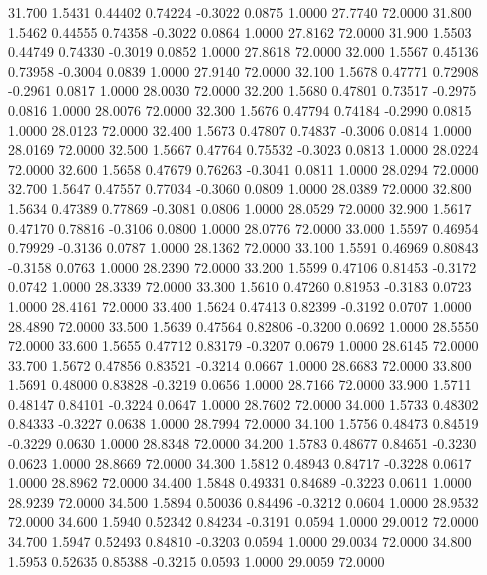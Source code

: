   31.700   1.5431   0.44402   0.74224  -0.3022   0.0875   1.0000  27.7740  72.0000
  31.800   1.5462   0.44555   0.74358  -0.3022   0.0864   1.0000  27.8162  72.0000
  31.900   1.5503   0.44749   0.74330  -0.3019   0.0852   1.0000  27.8618  72.0000
  32.000   1.5567   0.45136   0.73958  -0.3004   0.0839   1.0000  27.9140  72.0000
  32.100   1.5678   0.47771   0.72908  -0.2961   0.0817   1.0000  28.0030  72.0000
  32.200   1.5680   0.47801   0.73517  -0.2975   0.0816   1.0000  28.0076  72.0000
  32.300   1.5676   0.47794   0.74184  -0.2990   0.0815   1.0000  28.0123  72.0000
  32.400   1.5673   0.47807   0.74837  -0.3006   0.0814   1.0000  28.0169  72.0000
  32.500   1.5667   0.47764   0.75532  -0.3023   0.0813   1.0000  28.0224  72.0000
  32.600   1.5658   0.47679   0.76263  -0.3041   0.0811   1.0000  28.0294  72.0000
  32.700   1.5647   0.47557   0.77034  -0.3060   0.0809   1.0000  28.0389  72.0000
  32.800   1.5634   0.47389   0.77869  -0.3081   0.0806   1.0000  28.0529  72.0000
  32.900   1.5617   0.47170   0.78816  -0.3106   0.0800   1.0000  28.0776  72.0000
  33.000   1.5597   0.46954   0.79929  -0.3136   0.0787   1.0000  28.1362  72.0000
  33.100   1.5591   0.46969   0.80843  -0.3158   0.0763   1.0000  28.2390  72.0000
  33.200   1.5599   0.47106   0.81453  -0.3172   0.0742   1.0000  28.3339  72.0000
  33.300   1.5610   0.47260   0.81953  -0.3183   0.0723   1.0000  28.4161  72.0000
  33.400   1.5624   0.47413   0.82399  -0.3192   0.0707   1.0000  28.4890  72.0000
  33.500   1.5639   0.47564   0.82806  -0.3200   0.0692   1.0000  28.5550  72.0000
  33.600   1.5655   0.47712   0.83179  -0.3207   0.0679   1.0000  28.6145  72.0000
  33.700   1.5672   0.47856   0.83521  -0.3214   0.0667   1.0000  28.6683  72.0000
  33.800   1.5691   0.48000   0.83828  -0.3219   0.0656   1.0000  28.7166  72.0000
  33.900   1.5711   0.48147   0.84101  -0.3224   0.0647   1.0000  28.7602  72.0000
  34.000   1.5733   0.48302   0.84333  -0.3227   0.0638   1.0000  28.7994  72.0000
  34.100   1.5756   0.48473   0.84519  -0.3229   0.0630   1.0000  28.8348  72.0000
  34.200   1.5783   0.48677   0.84651  -0.3230   0.0623   1.0000  28.8669  72.0000
  34.300   1.5812   0.48943   0.84717  -0.3228   0.0617   1.0000  28.8962  72.0000
  34.400   1.5848   0.49331   0.84689  -0.3223   0.0611   1.0000  28.9239  72.0000
  34.500   1.5894   0.50036   0.84496  -0.3212   0.0604   1.0000  28.9532  72.0000
  34.600   1.5940   0.52342   0.84234  -0.3191   0.0594   1.0000  29.0012  72.0000
  34.700   1.5947   0.52493   0.84810  -0.3203   0.0594   1.0000  29.0034  72.0000
  34.800   1.5953   0.52635   0.85388  -0.3215   0.0593   1.0000  29.0059  72.0000

